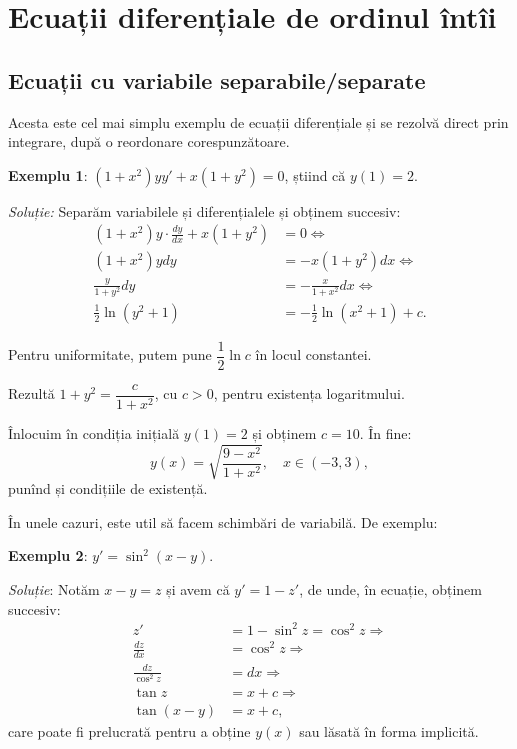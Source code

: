 
\chapter{Ecuații diferențiale de ordinul întîi}

\indent{}

\section{Ecuații cu variabile separabile/separate}
\label{sec:sep}

\indent\indent Acesta este cel mai simplu exemplu de ecuații diferențiale și se 
rezolvă direct prin integrare, după o reordonare corespunzătoare.

\textbf{Exemplu 1}: $(1 + x^2) yy' + x(1 + y^2) = 0$, știind că $y(1) = 2$.

\emph{Soluție:} Separăm variabilele și diferențialele și obținem succesiv:
\begin{align*}
  (1 + x^2) y \cdot \frac{dy}{dx} + x(1 + y^2) &= 0 \Leftrightarrow\\
  (1 + x^2) y dy &= -x(1 + y^2) dx \Leftrightarrow \\
  \frac{y}{1 + y^2} dy &= -\frac{x}{1 + x^2} dx \Leftrightarrow \\
  \frac{1}{2} \ln (y^2 + 1) &= -\frac{1}{2} \ln(x^2 + 1) + c.
\end{align*}

Pentru uniformitate, putem pune $\dfrac{1}{2} \ln c$ în locul constantei.

Rezultă $1 + y^2 = \dfrac{c}{1 + x^2}$, cu $c > 0$, pentru existența logaritmului.

Înlocuim în condiția inițială $y(1) = 2$ și obținem $c = 10$. În fine:
\[
  y(x) = \sqrt{\frac{9 - x^2}{1 + x^2}}, \quad x \in (-3, 3),
\]
punînd și condițiile de existență.

\vspace{2cm}

În unele cazuri, este util să facem schimbări de variabilă. De exemplu:

\textbf{Exemplu 2}: $y' = \sin^2(x - y)$.

\emph{Soluție}: Notăm $x - y = z$ și avem că $y' = 1 - z'$, de unde, în
ecuație, obținem succesiv:
\begin{align*}
  z' & = 1 - \sin^2 z = \cos^2 z \Rightarrow\\
  \frac{dz}{dx} &= \cos^2 z \Rightarrow \\
  \frac{dz}{\cos^2 z} &= dx \Rightarrow \\
  \tan z &= x + c \Rightarrow \\
  \tan (x - y) &= x + c,
\end{align*}
care poate fi prelucrată pentru a obține $y(x)$ sau lăsată în forma implicită.

